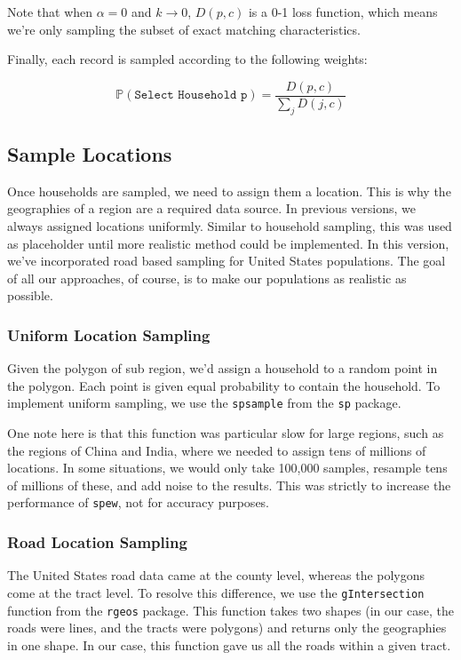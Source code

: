 \documentclass{article}
\begin{document}
		Note that when $\alpha = 0$ and $k \to 0$, $D(p, c)$ is a 0-1 loss function, which means we're only sampling the subset of exact matching characteristics. 

		Finally, each record is sampled according to the following weights:

		\begin{equation}
			\mathbb{P}(\texttt{Select Household p}) = \frac{D(p, c)}{\sum_j D(j, c)}
		\end{equation}

		\subsection{Sample Locations}
		Once households are sampled, we need to assign them a location. This is why the geographies of a region are a required data source. In previous versions, we always assigned locations uniformly. Similar to household sampling, this was used as placeholder until more realistic method could be implemented. In this version, we've incorporated road based sampling for United States populations. The goal of all our approaches, of course, is to make our populations as realistic as possible. 

		\subsubsection{Uniform Location Sampling}
		Given the polygon of sub region, we'd assign a household to a random point in the polygon. Each point is given equal probability to contain the household. To implement uniform sampling, we use the \verb|spsample| from the \verb|sp| package.

		One note here is that this function was particular slow for large regions, such as the regions of China and India, where we needed to assign tens of millions of locations. In some situations, we would only take 100,000 samples, resample tens of millions of these, and add noise to the results. This was strictly to increase the performance of \verb|spew|, not for accuracy purposes. 

		\subsubsection{Road Location Sampling}
		The United States road data came at the county level, whereas the polygons come at the tract level. To resolve this difference, we use the \verb|gIntersection| function from the \verb|rgeos| package. This function takes two shapes (in our case, the roads were lines, and the tracts were polygons) and returns only the geographies in one shape. In our case, this function gave us all the roads within a given tract. 
\end{document}
